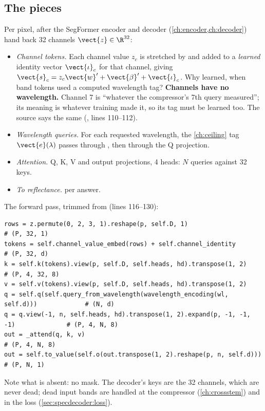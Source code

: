 \subsection{The pieces}

Per pixel, after the SegFormer encoder and decoder (\cref{ch:encoder,ch:decoder}) hand back 32 channels $\vect{z}\in\R^{32}$:
\begin{itemize}
\item \emph{Channel tokens.} Each channel value $z_c$ is stretched by  and added to a \emph{learned} identity vector $\vect{\iota}_c$ for that channel, giving $\vect{s}_c = z_c\vect{w}' + \vect{\beta}' + \vect{\iota}_c$. Why learned, when band tokens used a computed wavelength tag? \textbf{Channels have no wavelength.} Channel 7 is ``whatever the compressor's 7th query measured''; its meaning is whatever training made it, so its tag must be learned too. The source says the same (, lines 110--112).
\item \emph{Wavelength queries.} For each requested wavelength, the \cref{ch:ceiling} tag $\vect{e}(\lambda)$ passes through , then through the Q projection.
\item \emph{Attention.} Q, K, V and output projections, 4 heads: $N$ queries against 32 keys.
\item \emph{To reflectance.}  per answer.
\end{itemize}


The forward pass, trimmed from  (lines 116--130):
\begin{lstlisting}
rows = z.permute(0, 2, 3, 1).reshape(p, self.D, 1)                                  # (P, 32, 1)
tokens = self.channel_value_embed(rows) + self.channel_identity                     # (P, 32, d)
k = self.k(tokens).view(p, self.D, self.heads, hd).transpose(1, 2)                  # (P, 4, 32, 8)
v = self.v(tokens).view(p, self.D, self.heads, hd).transpose(1, 2)
q = self.q(self.query_from_wavelength(wavelength_encoding(wl, self.d)))             # (N, d)
q = q.view(-1, n, self.heads, hd).transpose(1, 2).expand(p, -1, -1, -1)              # (P, 4, N, 8)
out = _attend(q, k, v)                                                              # (P, 4, N, 8)
out = self.to_value(self.o(out.transpose(1, 2).reshape(p, n, self.d)))              # (P, N, 1)
\end{lstlisting}
Note what is absent: no mask. The decoder's keys are the 32 channels, which are never dead; dead input bands are handled at the compressor (\cref{ch:crossstem}) and in the loss (\cref{sec:specdecoder:loss}).

